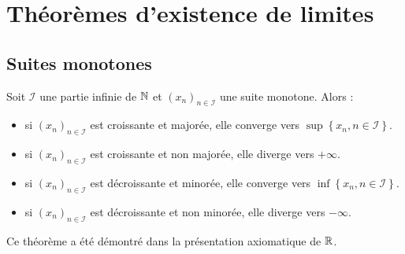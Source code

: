 \section{Théorèmes d'existence de limites}
\subsection{Suites monotones} 
\begin{thmn}
Soit $\mathcal I$ une partie infinie de $\mathbb{N}$ et $\left(x_n \right)_{n\in\mathcal I}$ une suite monotone. Alors :
\begin{itemize}
 \item si $\left(x_n \right)_{n\in\mathcal I}$ est croissante et majorée, elle converge vers $\sup \left\lbrace x_n , n\in \mathcal I  \right\rbrace$.
 \item si $\left(x_n \right)_{n\in\mathcal I}$ est croissante et non majorée, elle diverge vers $+\infty$. 
 \item si $\left(x_n \right)_{n\in\mathcal I}$ est décroissante et minorée, elle converge vers $\inf \left\lbrace x_n , n\in \mathcal I  \right\rbrace$.
 \item si $\left(x_n \right)_{n\in\mathcal I}$ est décroissante et non minorée, elle diverge vers $-\infty$. 
\end{itemize}
\end{thmn}
\begin{demo}
  Ce théorème a été démontré dans la présentation axiomatique de $\mathbb{R}$.
\end{demo}

